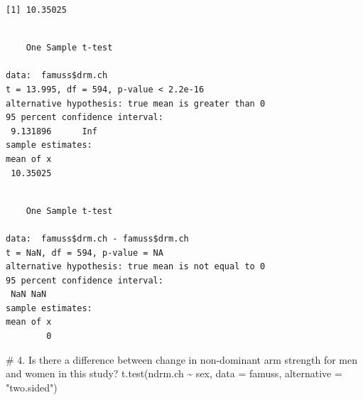 \documentclass[
  letterpaper,
  DIV=11,
  numbers=noendperiod,
  oneside]{scrreprt}
\newenvironment{Shaded}{\begin{snugshade}}{\end{snugshade}}
\newcommand{\AttributeTok}[1]{\textcolor[rgb]{0.40,0.45,0.13}{#1}}
\newcommand{\CommentTok}[1]{\textcolor[rgb]{0.37,0.37,0.37}{#1}}
\newcommand{\DecValTok}[1]{\textcolor[rgb]{0.68,0.00,0.00}{#1}}
\newcommand{\FunctionTok}[1]{\textcolor[rgb]{0.28,0.35,0.67}{#1}}
\newcommand{\NormalTok}[1]{\textcolor[rgb]{0.00,0.23,0.31}{#1}}
\newcommand{\SpecialCharTok}[1]{\textcolor[rgb]{0.37,0.37,0.37}{#1}}
\newcommand{\StringTok}[1]{\textcolor[rgb]{0.13,0.47,0.30}{#1}}
\begin{document}
\begin{Shaded}
\end{Shaded}

\begin{verbatim}
[1] 10.35025
\end{verbatim}

\begin{Shaded}
\end{Shaded}

\begin{verbatim}

    One Sample t-test

data:  famuss$drm.ch
t = 13.995, df = 594, p-value < 2.2e-16
alternative hypothesis: true mean is greater than 0
95 percent confidence interval:
 9.131896      Inf
sample estimates:
mean of x 
 10.35025 
\end{verbatim}

\begin{Shaded}
\end{Shaded}

\begin{verbatim}

    One Sample t-test

data:  famuss$drm.ch - famuss$drm.ch
t = NaN, df = 594, p-value = NA
alternative hypothesis: true mean is not equal to 0
95 percent confidence interval:
 NaN NaN
sample estimates:
mean of x 
        0 
\end{verbatim}

\begin{Shaded}
\begin{Highlighting}[]
\CommentTok{\# 4. Is there a difference between change in non{-}dominant arm strength for men and women in this study?}
\FunctionTok{t.test}\NormalTok{(ndrm.ch }\SpecialCharTok{\textasciitilde{}}\NormalTok{ sex, }\AttributeTok{data =}\NormalTok{ famuss, }\AttributeTok{alternative =} \StringTok{"two.sided"}\NormalTok{)}
\end{Highlighting}
\end{Shaded}
\end{document}
